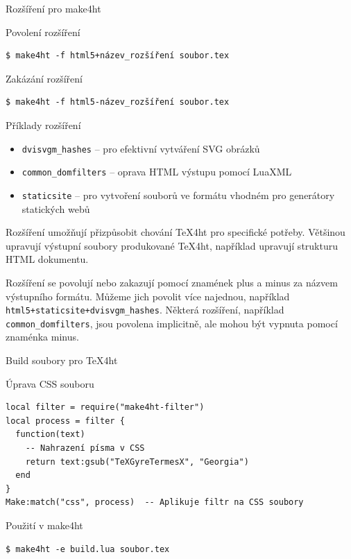 \begin{frame}[fragile]{Rozšíření pro make4ht}
\begin{block}{Povolení rozšíření}
\begin{verbatim}
$ make4ht -f html5+název_rozšíření soubor.tex
\end{verbatim}
\end{block}
\begin{block}{Zakázání rozšíření}
\begin{verbatim}
$ make4ht -f html5-název_rozšíření soubor.tex 
\end{verbatim}
\end{block}



\begin{block}{Příklady rozšíření}
\begin{itemize}
\item \verb|dvisvgm_hashes| -- pro efektivní vytváření SVG obrázků
\item \verb|common_domfilters| -- oprava HTML výstupu pomocí LuaXML
\item \verb|staticsite| -- pro vytvoření souborů ve formátu vhodném pro generátory statických webů
\end{itemize}
\end{block}

\end{frame}

Rozšíření umožňují přizpůsobit chování \TeX4ht pro specifické potřeby. Většinou upravují výstupní soubory
produkované \TeX4ht, například  upravují strukturu HTML dokumentu. 

Rozšíření se povolují nebo zakazují pomocí znamének plus a minus za názvem výstupního formátu. 
Můžeme jich povolit více najednou, například \verb|html5+staticsite+dvisvgm_hashes|.
Některá rozšíření, například \verb|common_domfilters|, jsou povolena implicitně, ale mohou být vypnuta pomocí znaménka minus.

\begin{frame}[fragile]{Build soubory pro TeX4ht}

\begin{block}{Úprava CSS souboru}
\begin{verbatim}
local filter = require("make4ht-filter")  
local process = filter {  
  function(text)  
    -- Nahrazení písma v CSS  
    return text:gsub("TeXGyreTermesX", "Georgia")  
  end  
}  
Make:match("css", process)  -- Aplikuje filtr na CSS soubory
\end{verbatim}
\end{block}

\begin{block}{Použití v make4ht}
\begin{verbatim}
$ make4ht -e build.lua soubor.tex
\end{verbatim}
\end{block}
\end{frame}

